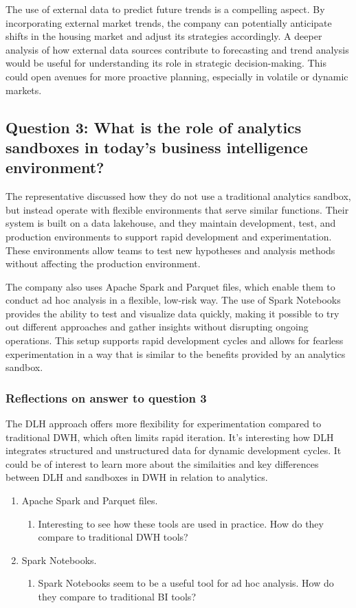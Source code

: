 The use of external data to predict future trends is a compelling aspect. By incorporating external market trends, the company can potentially 
anticipate shifts in the housing market and adjust its strategies accordingly. A deeper analysis of how external data sources contribute to forecasting 
and trend analysis would be useful for understanding its role in strategic decision-making. This could open avenues for more proactive planning, 
especially in volatile or dynamic markets.

\subsection{Question 3: What is the role of analytics sandboxes in today's business intelligence environment?} 

The representative discussed how they do not use a traditional analytics sandbox, but instead operate with flexible environments that 
serve similar functions. Their system is built on a data lakehouse, and they maintain development, test, and production environments 
to support rapid development and experimentation. These environments allow teams to test new hypotheses and analysis methods without 
affecting the production environment.

The company also uses Apache Spark and Parquet files, which enable them to conduct ad hoc analysis in a flexible, low-risk way. The 
use of Spark Notebooks provides the ability to test and visualize data quickly, making it possible to try out different approaches and 
gather insights without disrupting ongoing operations. This setup supports rapid development cycles and allows for fearless experimentation 
in a way that is similar to the benefits provided by an analytics sandbox.
\subsubsection{Reflections on answer to question 3}

The DLH approach offers more flexibility for experimentation compared to traditional DWH, which often limits rapid iteration. 
It's interesting how DLH integrates structured and unstructured data for dynamic development cycles. It could be of interest
to learn more about the similaities and key differences between DLH and sandboxes in DWH in relation to analytics.

\begin{enumerate}
    \item Apache Spark and Parquet files.
    \begin{enumerate}
        \item Interesting to see how these tools are used in practice. How do they compare to traditional DWH tools?
    \end{enumerate}
    \item Spark Notebooks.
    \begin{enumerate}
        \item Spark Notebooks seem to be a useful tool for ad hoc analysis. How do they compare to traditional BI tools?
    \end{enumerate}
\end{enumerate}

